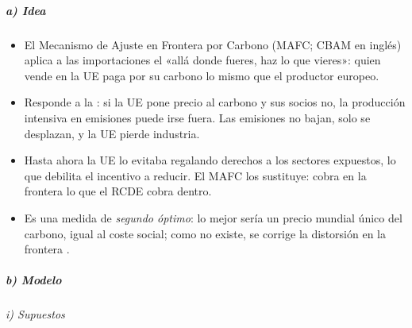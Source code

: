 \documentclass[11pt]{article}
\begin{document}
\subparagraph{a) Idea}

\begin{itemize}
\item El Mecanismo de Ajuste en Frontera por Carbono (MAFC; CBAM en inglés) aplica a las importaciones el «allá donde fueres, haz lo que vieres»: quien vende en la UE paga por su carbono lo mismo que el productor europeo.
\item Responde a la : si la UE pone precio al carbono y sus socios no, la producción intensiva en emisiones puede irse fuera. Las emisiones no bajan, solo se desplazan, y la UE pierde industria.
\item Hasta ahora la UE lo evitaba regalando derechos a los sectores expuestos, lo que debilita el incentivo a reducir. El MAFC los sustituye: cobra en la frontera lo que el RCDE cobra dentro.
\item Es una medida de \emph{segundo óptimo}: lo mejor sería un precio mundial único del carbono, igual al coste social; como no existe, se corrige la distorsión en la frontera .
\end{itemize}

\subparagraph{b) Modelo}

\hspace*{3.6em}\emph{i) Supuestos}
\end{document}
